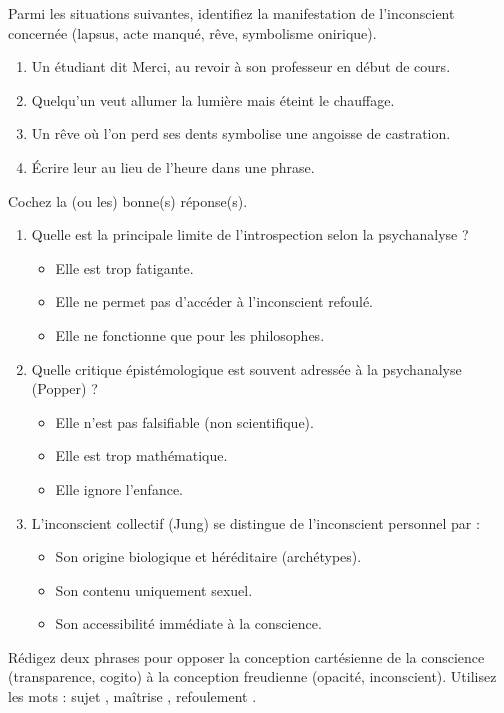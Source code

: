 \documentclass[11pt]{article}
\begin{document}
\begin{exercice}
Parmi les situations suivantes, identifiez la manifestation de l'inconscient concernée (lapsus, acte manqué, rêve, symbolisme onirique).
\begin{enumerate}
    \item Un étudiant dit \og Merci, au revoir \fg{} à son professeur en début de cours.
    \item Quelqu'un veut allumer la lumière mais éteint le chauffage.
    \item Un rêve où l'on perd ses dents symbolise une angoisse de castration.
    \item Écrire \og leur \fg{} au lieu de \og l'heure \fg{} dans une phrase.
\end{enumerate}
\end{exercice}

\begin{exercice}
Cochez la (ou les) bonne(s) réponse(s).
\begin{enumerate}
    \item Quelle est la principale limite de l'introspection selon la psychanalyse ?
    \begin{itemize}
        \item[A.] Elle est trop fatigante.
        \item[B.] Elle ne permet pas d'accéder à l'inconscient refoulé.
        \item[C.] Elle ne fonctionne que pour les philosophes.
    \end{itemize}
    \item Quelle critique épistémologique est souvent adressée à la psychanalyse (Popper) ?
    \begin{itemize}
        \item[A.] Elle n'est pas falsifiable (non scientifique).
        \item[B.] Elle est trop mathématique.
        \item[C.] Elle ignore l'enfance.
    \end{itemize}
    \item L'inconscient collectif (Jung) se distingue de l'inconscient personnel par :
    \begin{itemize}
        \item[A.] Son origine biologique et héréditaire (archétypes).
        \item[B.] Son contenu uniquement sexuel.
        \item[C.] Son accessibilité immédiate à la conscience.
    \end{itemize}
\end{enumerate}
\end{exercice}

\begin{exercice}
Rédigez deux phrases pour opposer la conception cartésienne de la conscience (transparence, cogito) à la conception freudienne (opacité, inconscient). Utilisez les mots : \og sujet \fg{}, \og maîtrise \fg{}, \og refoulement \fg{}.
\end{exercice}
\end{document}
